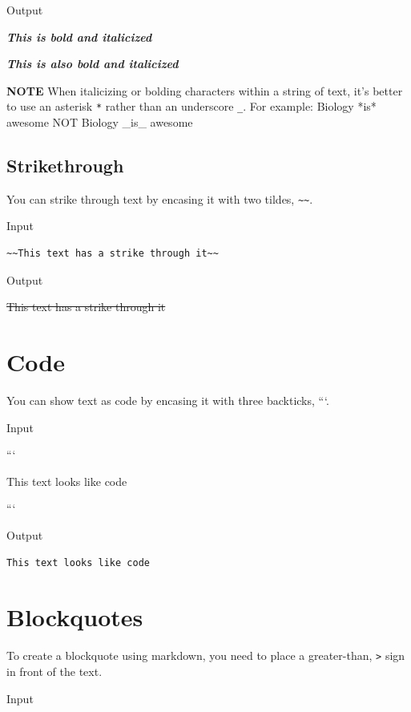 \documentclass[
]{book}
\begin{document}
Output

\textbf{\emph{This is bold and italicized}}

\textbf{\emph{This is also bold and italicized}}

\textbf{NOTE} When italicizing or bolding characters within a string of text, it's better to use an asterisk \texttt{*} rather than an underscore \texttt{\_}. For example: Biology *is* awesome NOT Biology \_is\_ awesome

\hypertarget{strikethrough}{%
\subsection*{Strikethrough}\label{strikethrough}}

You can strike through text by encasing it with two tildes, \texttt{\textasciitilde{}\textasciitilde{}}.

Input

\begin{verbatim}
~~This text has a strike through it~~
\end{verbatim}

Output

\sout{This text has a strike through it}

\hypertarget{code}{%
\section{Code}\label{code}}

You can show text as code by encasing it with three backticks, ```.

Input

```

This text looks like code

```

Output

\begin{verbatim}
This text looks like code
\end{verbatim}

\hypertarget{blockquotes}{%
\section{Blockquotes}\label{blockquotes}}

To create a blockquote using markdown, you need to place a greater-than, \texttt{\textgreater{}} sign in front of the text.

Input
\end{document}
